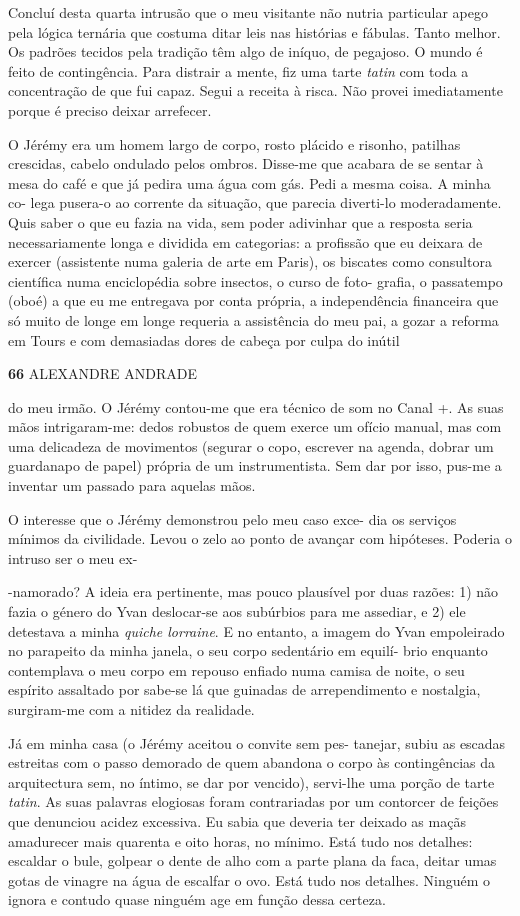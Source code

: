 Concluí desta quarta intrusão que o meu visitante não nutria particular
apego pela lógica ternária que costuma ditar leis nas histórias e
fábulas. Tanto melhor. Os padrões tecidos pela tradição têm algo de
iníquo, de pegajoso. O mundo é feito de contingência. Para distrair a
mente, fiz uma tarte \emph{tatin }com toda a concentração de que fui
capaz. Segui a receita à risca. Não provei imediatamente porque é
preciso deixar arrefecer.

O Jérémy era um homem largo de corpo, rosto plácido e risonho, patilhas
crescidas, cabelo ondulado pelos ombros. Disse-me que acabara de se
sentar à mesa do café e que já pedira uma água com gás. Pedi a mesma
coisa. A minha co- lega pusera-o ao corrente da situação, que parecia
diverti-lo moderadamente. Quis saber o que eu fazia na vida, sem poder
adivinhar que a resposta seria necessariamente longa e dividida em
categorias: a profissão que eu deixara de exercer (assistente numa
galeria de arte em Paris), os biscates como consultora científica numa
enciclopédia sobre insectos, o curso de foto- grafia, o passatempo
(oboé) a que eu me entregava por conta própria, a independência
financeira que só muito de longe em longe requeria a assistência do meu
pai, a gozar a reforma em Tours e com demasiadas dores de cabeça por
culpa do inútil

\textbf{66 }ALEXANDRE ANDRADE

do meu irmão. O Jérémy contou-me que era técnico de som no Canal +. As
suas mãos intrigaram-me: dedos robustos de quem exerce um ofício manual,
mas com uma delicadeza de movimentos (segurar o copo, escrever na
agenda, dobrar um guardanapo de papel) própria de um instrumentista. Sem
dar por isso, pus-me a inventar um passado para aquelas mãos.

O interesse que o Jérémy demonstrou pelo meu caso exce- dia os serviços
mínimos da civilidade. Levou o zelo ao ponto de avançar com hipóteses.
Poderia o intruso ser o meu ex-

-namorado? A ideia era pertinente, mas pouco plausível por duas razões:
1) não fazia o género do Yvan deslocar-se aos subúrbios para me
assediar, e 2) ele detestava a minha \emph{quiche lorraine}. E no
entanto, a imagem do Yvan empoleirado no parapeito da minha janela, o
seu corpo sedentário em equilí- brio enquanto contemplava o meu corpo em
repouso enfiado numa camisa de noite, o seu espírito assaltado por
sabe-se lá que guinadas de arrependimento e nostalgia, surgiram-me com a
nitidez da realidade.

Já em minha casa (o Jérémy aceitou o convite sem pes- tanejar, subiu as
escadas estreitas com o passo demorado de quem abandona o corpo às
contingências da arquitectura sem, no íntimo, se dar por vencido),
servi-lhe uma porção de tarte \emph{tatin}. As suas palavras elogiosas
foram contrariadas por um contorcer de feições que denunciou acidez
excessiva. Eu sabia que deveria ter deixado as maçãs amadurecer mais
quarenta e oito horas, no mínimo. Está tudo nos detalhes: escaldar o
bule, golpear o dente de alho com a parte plana da faca, deitar umas
gotas de vinagre na água de escalfar o ovo. Está tudo nos detalhes.
Ninguém o ignora e contudo quase ninguém age em função dessa certeza.

